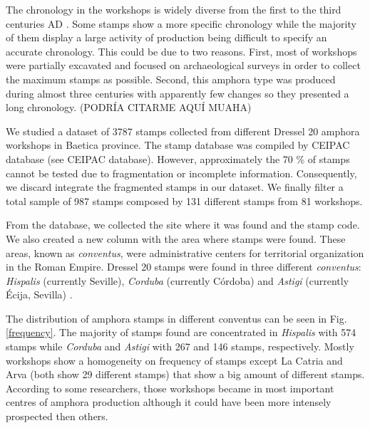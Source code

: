 \documentclass[review]{elsarticle}
\begin{document}
The chronology in the workshops is widely diverse from the first to the third centuries AD \citep{millet_anforas_1998,rodriguez_baetican_1998,chic2005comercio}. Some stamps show a more specific chronology while the majority of them display a large activity of production being difficult to specify an accurate chronology. This could be due to two reasons. First, most of workshops were partially excavated and focused on archaeological surveys in order to collect the maximum stamps as possible. Second, this amphora type was produced during almost three centuries with apparently few changes so they presented a long chronology. (PODRÍA CITARME AQUÍ MUAHA)
 
We studied a dataset of 3787 stamps collected from different Dressel 20 amphora workshops in Baetica province. The stamp database was compiled by CEIPAC database \citep{remesal_centro_2015} (see CEIPAC database). However, approximately the 70 \% of stamps cannot be tested due to fragmentation or incomplete information. Consequently, we discard integrate the fragmented stamps in our dataset. We finally filter a total sample of 987 stamps composed by 131 different stamps from 81 workshops. 

From the database, we collected the site where it was found and the stamp code. We also created a new column with the area where stamps were found. These areas, known as \textit{conventus}, were administrative centers for territorial organization in the Roman Empire. Dressel 20 stamps were found in three different \textit{conventus}: \textit{Hispalis} (currently Seville), \textit{Corduba} (currently C\'ordoba) and \textit{Astigi} (currently Écija, Sevilla) \citep{rodriguez_economioleicola_1977,chic_datos_2001,berni_millet_epigrafianforica_2008} .

The distribution of amphora stamps in different conventus can be seen in Fig. \ref{frequency}. The majority of stamps found are concentrated in \textit{Hispalis} with 574 stamps while \textit{Corduba} and \textit{Astigi} with 267 and 146 stamps, respectively. Mostly workshops show a homogeneity on frequency of stamps except La Catria and Arva (both show 29 different stamps) that show a big amount of different stamps. According to some researchers, those workshops became in most important centres of amphora production although it could have been more intensely prospected then others. \citep{arva_1997}
 
\end{document}
